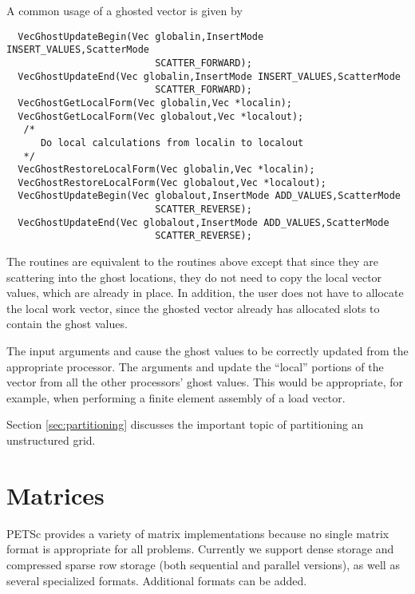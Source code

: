 A common usage of a ghosted vector is given by
 
\begin{verbatim}
  VecGhostUpdateBegin(Vec globalin,InsertMode INSERT_VALUES,ScatterMode
                          SCATTER_FORWARD);
  VecGhostUpdateEnd(Vec globalin,InsertMode INSERT_VALUES,ScatterMode
                          SCATTER_FORWARD);
  VecGhostGetLocalForm(Vec globalin,Vec *localin);
  VecGhostGetLocalForm(Vec globalout,Vec *localout);
   /*
      Do local calculations from localin to localout 
   */
  VecGhostRestoreLocalForm(Vec globalin,Vec *localin);
  VecGhostRestoreLocalForm(Vec globalout,Vec *localout);
  VecGhostUpdateBegin(Vec globalout,InsertMode ADD_VALUES,ScatterMode
                          SCATTER_REVERSE);
  VecGhostUpdateEnd(Vec globalout,InsertMode ADD_VALUES,ScatterMode
                          SCATTER_REVERSE);
\end{verbatim}
      
The routines  are equivalent to the routines 
above except that since they are scattering into the ghost locations, they do not need
to copy the local vector values, which are already in place. In addition, the user does not
have to allocate the local work vector, since the ghosted vector already has allocated 
slots to contain the ghost values.

The input arguments  and 
cause the ghost values to be correctly updated from the appropriate
processor. The arguments  and 
update the ``local'' portions of the vector from all the other
processors' ghost values.  This would be appropriate, for example,
when performing a finite element assembly of a load vector.

Section \ref{sec:partitioning} discusses the important topic of partitioning 
an unstructured grid.


\chapter{Matrices}
\label{chapter:matrices}

PETSc provides a variety of matrix implementations because no
single matrix format is appropriate for all problems.  Currently we
support dense storage and compressed sparse row storage (both
sequential and parallel versions), as well as several specialized
formats.  Additional formats can be added.

